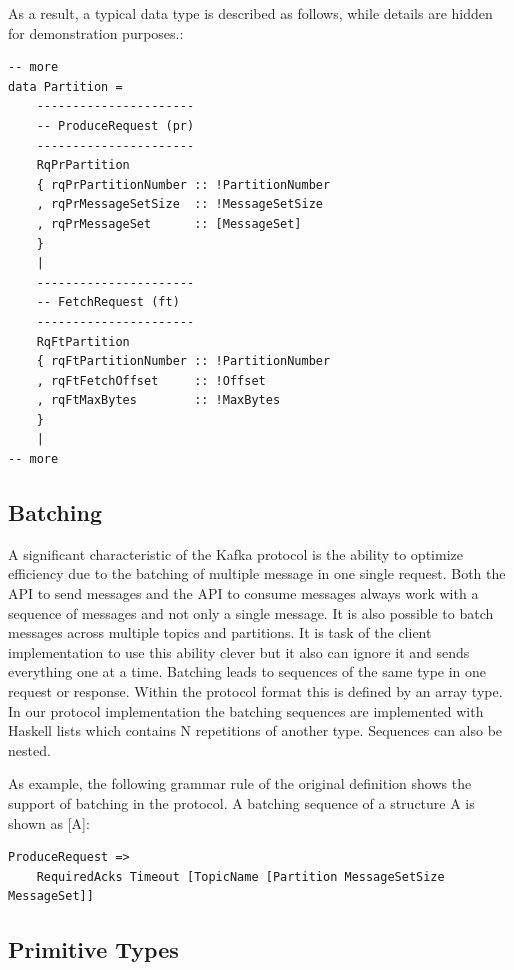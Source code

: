As a result, a typical data type is described as follows, while details are
hidden for demonstration purposes.:

\begin{lstlisting}
-- more
data Partition =
    ----------------------
    -- ProduceRequest (pr)
    ----------------------
    RqPrPartition
    { rqPrPartitionNumber :: !PartitionNumber
    , rqPrMessageSetSize  :: !MessageSetSize
    , rqPrMessageSet      :: [MessageSet]
    }
    |
    ----------------------
    -- FetchRequest (ft)
    ----------------------
    RqFtPartition
    { rqFtPartitionNumber :: !PartitionNumber
    , rqFtFetchOffset     :: !Offset
    , rqFtMaxBytes        :: !MaxBytes
    }
    |
-- more
\end{lstlisting}


\subsection{Batching}
\label{impl-prot-batching}
A significant characteristic of the Kafka protocol is the ability to optimize
efficiency due to the batching of multiple message in one single request. Both
the API to send messages and the API to consume messages always work with a
sequence of messages and not only a single message. It is also possible to batch
messages across multiple topics and partitions. It is task of the client
implementation to use this ability clever but it also can ignore it and sends everything
one at a time. Batching leads to sequences of the same type in one request or response. Within
the protocol format this is defined by an array type. In our protocol
implementation the batching sequences are implemented with Haskell lists which
contains N repetitions of another type. Sequences can also be nested. 

As example, the following grammar rule of the original definition shows the
support of batching in the protocol. A batching sequence of a structure A is
shown as [A]:
\begin{lstlisting}
ProduceRequest => 
    RequiredAcks Timeout [TopicName [Partition MessageSetSize MessageSet]]
\end{lstlisting}

\subsection{Primitive Types}
\label{subsec:protocol-types-primitive}

